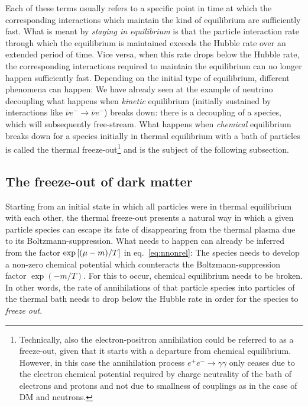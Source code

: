 Each of these terms usually refers to a specific point in time at which the corresponding interactions which maintain the kind of equilibrium are sufficiently fast. What is meant by \textit{staying in equilibrium} is that the particle interaction rate through which the equilibrium is maintained exceeds the Hubble rate over an extended period of time. Vice versa, when this rate drops below the Hubble rate, the corresponding interactions required to maintain the equilibrium can no longer happen sufficiently fast. Depending on the initial type of equilibrium,  different phenomena can happen: We have already seen at the example of neutrino decoupling what happens when \textit{kinetic} equilibrium (initially sustained by interactions like $\bar{\nu} e^{-} \rightarrow \bar{\nu} e^{-}$) breaks down: there is a decoupling of a species, which will subsequently free-stream. What happens when \textit{chemical} equilibrium breaks down for a species initially in thermal equilibrium with a bath of particles is called the thermal freeze-out\footnote{Technically, also the electron-positron annihilation could be referred to as a freeze-out, given that it starts with a departure from chemical equilibrium. However, in this case the annihilation process $e^+ e^- \rightarrow \gamma \gamma$ only ceases due to the electron chemical potential required by charge neutrality of the bath of electrons and protons and not due to smallness of couplings as in the case of \ac{DM} and neutrons.} and is the subject of the following subsection.

\subsection{The freeze-out of dark matter}

Starting from an initial state in which all particles were in thermal equilibrium with each other, the thermal freeze-out presents a natural way in which a given particle species can escape its fate of disappearing from the thermal plasma due to its Boltzmann-suppression. What needs to happen can  already be inferred from the factor $\exp \left[ (\mu - m)/T  \right]$ in eq.~\eqref{eq:nnonrel}: The species needs to develop a non-zero chemical potential which counteracts the Boltzmann-suppression factor $\exp{(-m/T)}$. For this to occur, chemical equilibrium needs to be broken. In other words, the rate of annihilations of that particle species into particles of the thermal bath needs to drop below the Hubble rate in order for the species to \textit{freeze out}.

